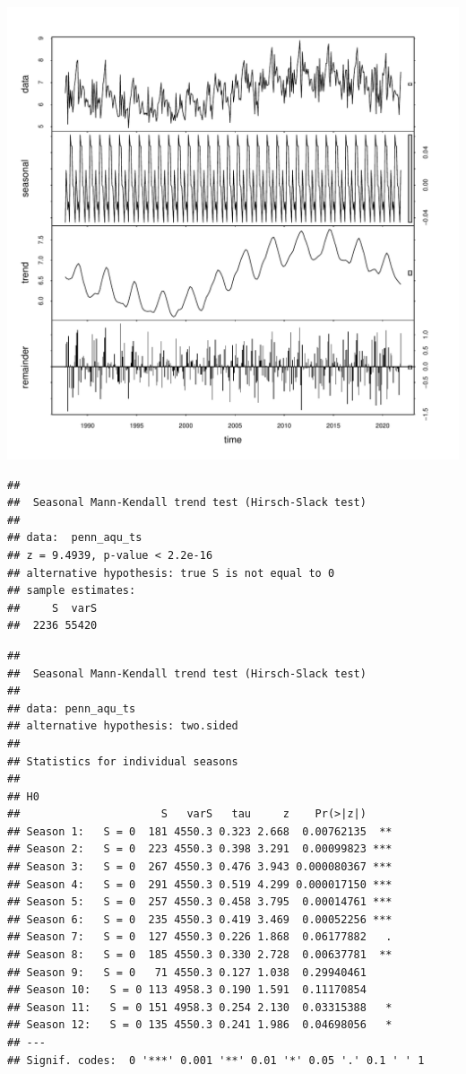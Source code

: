 \documentclass[
  12pt,
]{article}
\begin{document}
\includegraphics{Elliott_WDA_Project_files/figure-latex/seasonality_2-1.pdf}

\begin{verbatim}
## 
##  Seasonal Mann-Kendall trend test (Hirsch-Slack test)
## 
## data:  penn_aqu_ts
## z = 9.4939, p-value < 2.2e-16
## alternative hypothesis: true S is not equal to 0
## sample estimates:
##     S  varS 
##  2236 55420
\end{verbatim}

\begin{verbatim}
## 
##  Seasonal Mann-Kendall trend test (Hirsch-Slack test)
## 
## data: penn_aqu_ts
## alternative hypothesis: two.sided
## 
## Statistics for individual seasons
## 
## H0
##                      S   varS   tau     z    Pr(>|z|)    
## Season 1:   S = 0  181 4550.3 0.323 2.668  0.00762135  **
## Season 2:   S = 0  223 4550.3 0.398 3.291  0.00099823 ***
## Season 3:   S = 0  267 4550.3 0.476 3.943 0.000080367 ***
## Season 4:   S = 0  291 4550.3 0.519 4.299 0.000017150 ***
## Season 5:   S = 0  257 4550.3 0.458 3.795  0.00014761 ***
## Season 6:   S = 0  235 4550.3 0.419 3.469  0.00052256 ***
## Season 7:   S = 0  127 4550.3 0.226 1.868  0.06177882   .
## Season 8:   S = 0  185 4550.3 0.330 2.728  0.00637781  **
## Season 9:   S = 0   71 4550.3 0.127 1.038  0.29940461    
## Season 10:   S = 0 113 4958.3 0.190 1.591  0.11170854    
## Season 11:   S = 0 151 4958.3 0.254 2.130  0.03315388   *
## Season 12:   S = 0 135 4550.3 0.241 1.986  0.04698056   *
## ---
## Signif. codes:  0 '***' 0.001 '**' 0.01 '*' 0.05 '.' 0.1 ' ' 1
\end{verbatim}
\end{document}
